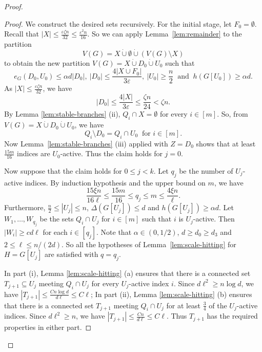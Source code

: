 \documentclass[10pt,a4paper]{amsart}
\newcommand{\eps}{\varepsilon}
\begin{document}
\begin{proof}
\begin{proof}
We construct the desired sets recursively.
For the initial stage, let $F_0=\emptyset$. Recall that
$|X|\le\frac{\eps\zeta n}{32}\le\frac{\eps^2n}{16}$.
So we can apply 
Lemma~\ref{lem:remainder} to the partition
\[
 V(G)=X\mathbin{\dot\cup}\emptyset
       \mathbin{\dot\cup}(V(G)\setminus X)
\]
to obtain the new partition $V(G)=X\mathbin{\dot\cup}D_0
       \mathbin{\dot\cup}U_0$ such that
\[
 e_G(D_0,U_0)\le\alpha d|D_0|,
 \ 
 |D_0|\le\frac{4|X\cup F_0|}{3\eps}, \ 
 |U_0|\ge\frac{n}{2} \ 
 \text{ and } \
 h(G[U_0])\ge\alpha d.
\]
As $|X|\le\frac{\eps\zeta n}{32}$, we have
\[
 |D_0|\le\frac{4|X|}{3\eps}
 \le\frac{\zeta n}{24}<\zeta n.
\]
By Lemma \ref{lem:stable-branches} (ii), $Q_i\cap X=\emptyset$ for every $i\in[m]$. So, from $V(G)=X\mathbin{\dot\cup}D_0
       \mathbin{\dot\cup}U_0$, we have
\[
 Q_i\setminus D_0=Q_i\cap U_0
\ \text{ for }i\in[m].
\]
Now Lemma~\ref{lem:stable-branches} (iii) applied
with $Z=D_0$  shows that at least $\frac{15m}{16}$ indices are
$U_0$-active. Thus the claim holds for $j=0$.


Now suppose that the claim holds  for $0\le j<k$. Let $q_j$ be the number of $U_j$-active indices. By induction hypothesis and the upper bound on $m$, we have
\[
 \frac{15\xi n}{16\ell}
 \le\frac{15m}{16}
 \le q_j\le m\le\frac{4\xi n}{\ell}.
\]
Furthermore, $\frac{n}{2}\le |U_j|\le n$, $\Delta(G[U_j])\le d$ and
$h(G[U_j])\ge\alpha d$. Let $W_1,\ldots,W_{q_j}$ be the sets $Q_i\cap U_j$
for $i\in[m]$ such that $i$ is $U_j$-active. Then $|W_i|\ge cd\ell$ for each $i\in [q_j]$. 
Note that $\alpha\in(0,1/2)$, $d\ge d_0\ge d_3$ and $2\le\ell\le n/(2d)$. 
So all the hypotheses of Lemma~\ref{lem:scale-hitting} for
$H=G[U_j]$ are satisfied with $q=q_j$.





In part (i), Lemma \ref{lem:scale-hitting} (a) ensures that there is a connected set $T_{j+1}\subseteq U_j$ meeting $Q_i\cap U_j$ for every $U_j$-active index $i$. Since $d\ell^2\ge n\log d$, we have 
$|T_{j+1}|\le \frac {Cn\log d}{d\ell}\le C\ell$; 
In part (ii), Lemma \ref{lem:scale-hitting} (b) ensures that there is a connected set $T_{j+1}$ meeting $Q_i\cap U_j$ for at least $\frac{3}{4}$ of the
$U_j$-active indices. Since $d\ell^2\ge n$, we have 
$|T_{j+1}|\le\frac{Cn}{d\ell}\le C\ell$.
Thus $T_{j+1}$ has the required properties in either part.



\end{proof}
\end{proof}
\end{document}
